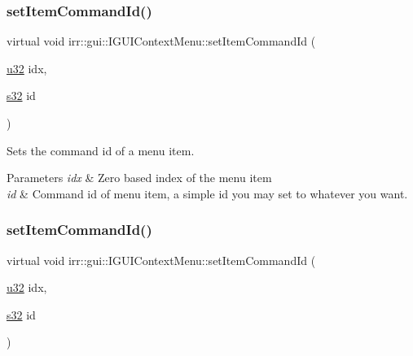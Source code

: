 \subsubsection{\texorpdfstring{set\+Item\+Command\+Id()}{setItemCommandId()}\hspace{0.1cm}{\footnotesize\ttfamily [1/2]}}
{\footnotesize\ttfamily virtual void irr\+::gui\+::\+I\+G\+U\+I\+Context\+Menu\+::set\+Item\+Command\+Id (\begin{DoxyParamCaption}\item[{\hyperlink{namespaceirr_a0416a53257075833e7002efd0a18e804}{u32}}]{idx,  }\item[{\hyperlink{namespaceirr_ac66849b7a6ed16e30ebede579f9b47c6}{s32}}]{id }\end{DoxyParamCaption})\hspace{0.3cm}{\ttfamily [pure virtual]}}



Sets the command id of a menu item. 


\begin{DoxyParams}{Parameters}
{\em idx} & Zero based index of the menu item \\
\hline
{\em id} & Command id of menu item, a simple id you may set to whatever you want. \\
\hline
\end{DoxyParams}
\mbox{\label{classirr_1_1gui_1_1IGUIContextMenu_a1380ff56d8c4c5b8de8d221062464654}} 
\subsubsection{\texorpdfstring{set\+Item\+Command\+Id()}{setItemCommandId()}\hspace{0.1cm}{\footnotesize\ttfamily [2/2]}}
{\footnotesize\ttfamily virtual void irr\+::gui\+::\+I\+G\+U\+I\+Context\+Menu\+::set\+Item\+Command\+Id (\begin{DoxyParamCaption}\item[{\hyperlink{namespaceirr_a0416a53257075833e7002efd0a18e804}{u32}}]{idx,  }\item[{\hyperlink{namespaceirr_ac66849b7a6ed16e30ebede579f9b47c6}{s32}}]{id }\end{DoxyParamCaption})\hspace{0.3cm}{\ttfamily [pure virtual]}}



